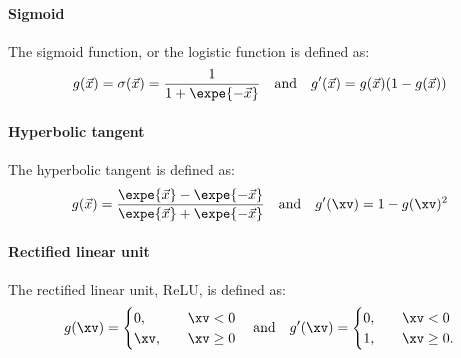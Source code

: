         \paragraph{Sigmoid}
            The sigmoid function, or the logistic function is defined as: 
            \begin{equation}\label{eq:ML:NN:activation:sigmoid}
                g(\vec{x}) = \sigma(\vec{x}) = \frac{1}{1+\expe{-\vec{x}}} \quad \mathrm{and} \quad g'(\vec{x}) = g(\vec{x})(1-g(\vec{x}))
            \end{equation}


        \paragraph{Hyperbolic tangent}
            The hyperbolic tangent is defined as:
            \begin{equation}\label{eq:ML:NN:activation:tanh}
                g(\vec{x}) = \frac{\expe{\vec{x}}-\expe{-\vec{x}}}{\expe{\vec{x}}+\expe{-\vec{x}}} \quad \mathrm{and} \quad g'(\xv)=1-g(\xv)^2
            \end{equation}

        \paragraph{Rectified linear unit}
            The rectified linear unit, ReLU, is defined as:
            \begin{equation}\label{eq:ML:NN:activation:relu}
                g(\xv) = 
                \begin{cases}
                    0, \quad & \xv < 0 \\
                    \xv, \quad & \xv \geq 0
                \end{cases}
                \quad \mathrm{and} \quad
                g'(\xv) = 
                \begin{cases}
                    0, \quad & \xv < 0 \\
                    1, \quad & \xv \geq 0.
                \end{cases}
            \end{equation}

